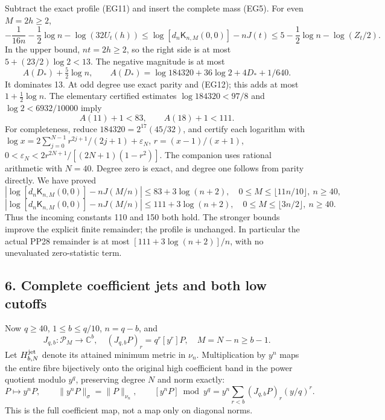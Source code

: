 \documentclass[10pt]{article}
\begin{document}
Subtract the exact profile (EG11) and insert the complete mass (EG5). For even \(M=2h\ge2\), \[
 -\frac1{16n}-\frac12\log n-\log(32U_t(h))
 \le\log[d_n\mathsf K_{n,M}(0,0)]-nJ(t)
 \le5-\frac12\log n-\log(Z_t/2).
 \tag{EG22}
\] In the upper bound, \(nt=2h\ge2\), so the right side is at most \(5+(23/2)\log2<13\). The negative magnitude is at most \[
 A(D_*)+\tfrac52\log n,\qquad
 A(D_*)=\log184320+36\log2+4D_*+1/640.
\] It dominates 13. At odd degree use exact parity and (EG12); this adds at most \(1+\frac12\log n\). The elementary certified estimates \(\log184320<97/8\) and \(\log2<6932/10000\) imply \[
 A(11)+1<83,\qquad A(18)+1<111.
\] For completeness, reduce \(184320=2^{17}(45/32)\), and certify each logarithm with \(\log x=2\sum_{j=0}^{N-1}r^{2j+1}/(2j+1)+\varepsilon_N\), \(r=(x-1)/(x+1)\), \(0<\varepsilon_N<2r^{2N+1}/[(2N+1)(1-r^2)]\). The companion uses rational arithmetic with \(N=40\). Degree zero is exact, and degree one follows from parity directly. We have proved \[
 \boxed{\left|\log[d_n\mathsf K_{n,M}(0,0)]-nJ(M/n)\right|
 \le83+3\log(n+2),\quad 0\le M\le\lfloor11n/10\rfloor,\ n\ge40,}
 \tag{EG23}
\] \[
 \boxed{\left|\log[d_n\mathsf K_{n,M}(0,0)]-nJ(M/n)\right|
 \le111+3\log(n+2),\quad 0\le M\le\lfloor3n/2\rfloor,\ n\ge40.}
 \tag{EG24}
\] Thus the incoming constants 110 and 150 both hold. The stronger bounds improve the explicit finite remainder; the profile is unchanged. In particular the actual PP28 remainder is at most \([111+3\log(n+2)]/n\), with no unevaluated zero-statistic term.

\subsection{6. Complete coefficient jets and both low cutoffs}\label{complete-coefficient-jets-and-both-low-cutoffs}

Now \(q\ge40\), \(1\le b\le q/10\), \(n=q-b\), and \[
 J_{q,b}:\mathcal P_M\longrightarrow\mathbb C^b,
 \quad (J_{q,b}P)_r=q^r[y^r]P,
 \quad M=N-n\ge b-1.
\] Let \(H_{b,N}^{\rm jet}\) denote its attained minimum metric in \(\nu_n\). Multiplication by \(y^n\) maps the entire fibre bijectively onto the original high coefficient band in the power quotient modulo \(y^q\), preserving degree \(N\) and norm exactly: \[
 P\longmapsto y^nP,\qquad
 \|y^nP\|_\sigma=\|P\|_{\nu_n},\qquad
 [y^nP]\bmod y^q=y^n\sum_{r<b}(J_{q,b}P)_r(y/q)^r.
 \tag{EG25}
\] This is the full coefficient map, not a map only on diagonal norms.
\end{document}

